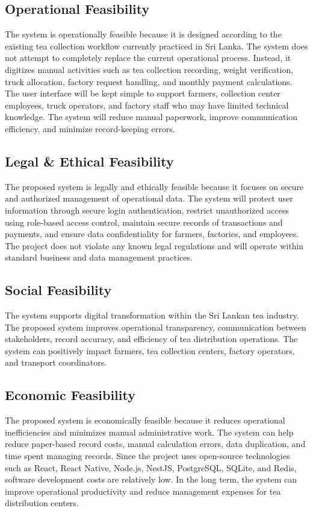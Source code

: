\subsection{Operational Feasibility}
The system is operationally feasible because it is designed according to the existing tea collection workflow currently practiced in Sri Lanka. The system does not attempt to completely replace the current operational process. Instead, it digitizes manual activities such as tea collection recording, weight verification, truck allocation, factory request handling, and monthly payment calculations. The user interface will be kept simple to support farmers, collection center employees, truck operators, and factory staff who may have limited technical knowledge. The system will reduce manual paperwork, improve communication efficiency, and minimize record-keeping errors.

\subsection{Legal \& Ethical Feasibility}
The proposed system is legally and ethically feasible because it focuses on secure and authorized management of operational data. The system will protect user information through secure login authentication, restrict unauthorized access using role-based access control, maintain secure records of transactions and payments, and ensure data confidentiality for farmers, factories, and employees. The project does not violate any known legal regulations and will operate within standard business and data management practices.

\subsection{Social Feasibility}
The system supports digital transformation within the Sri Lankan tea industry. The proposed system improves operational transparency, communication between stakeholders, record accuracy, and efficiency of tea distribution operations. The system can positively impact farmers, tea collection centers, factory operators, and transport coordinators.

\subsection{Economic Feasibility}
The proposed system is economically feasible because it reduces operational inefficiencies and minimizes manual administrative work. The system can help reduce paper-based record costs, manual calculation errors, data duplication, and time spent managing records. Since the project uses open-source technologies such as React, React Native, Node.js, NestJS, PostgreSQL, SQLite, and Redis, software development costs are relatively low. In the long term, the system can improve operational productivity and reduce management expenses for tea distribution centers.

